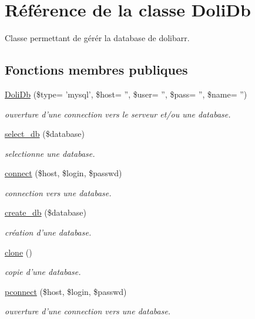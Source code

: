 \hypertarget{classDoliDb}{
\section{R\'{e}f\'{e}rence de la classe Doli\-Db}
\label{classDoliDb}
}
Classe permettant de g\'{e}r\'{e}r la database de dolibarr.  


\subsection*{Fonctions membres publiques}
\begin{CompactItemize}
\item 
\hyperlink{classDoliDb_a0}{Doli\-Db} (\$type= 'mysql', \$host= '', \$user= '', \$pass= '', \$name= '')
\begin{CompactList}\small\item\em ouverture d'une connection vers le serveur et/ou une database. \item\end{CompactList}\item 
\hyperlink{classDoliDb_a1}{select\_\-db} (\$database)
\begin{CompactList}\small\item\em selectionne une database. \item\end{CompactList}\item 
\hyperlink{classDoliDb_a2}{connect} (\$host, \$login, \$passwd)
\begin{CompactList}\small\item\em connection vers une database. \item\end{CompactList}\item 
\hyperlink{classDoliDb_a3}{create\_\-db} (\$database)
\begin{CompactList}\small\item\em cr\'{e}ation d'une database. \item\end{CompactList}\item 
\hyperlink{classDoliDb_a4}{clone} ()
\begin{CompactList}\small\item\em copie d'une database. \item\end{CompactList}\item 
\hyperlink{classDoliDb_a5}{pconnect} (\$host, \$login, \$passwd)
\begin{CompactList}\small\item\em ouverture d'une connection vers une database. \item\end{CompactList}\item 

\end{CompactItemize}
